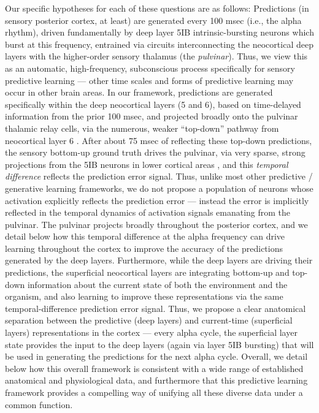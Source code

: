 \documentclass[11pt,twoside]{article}
\newif\myifpdf
\begin{document}
Our specific hypotheses for each of these questions are as follows: Predictions (in sensory posterior cortex, at least) are generated every 100 msec (i.e., the alpha rhythm), driven fundamentally by deep layer 5IB intrinsic-bursting neurons which burst at this frequency, entrained via circuits interconnecting the neocortical deep layers with the higher-order sensory thalamus (the {\em pulvinar}).  Thus, we view this as an automatic, high-frequency, subconscious process specifically for sensory predictive learning --- other time scales and forms of predictive learning may occur in other brain areas.  In our framework, predictions are generated specifically within the deep neocortical layers (5 and 6), based on time-delayed information from the prior 100 msec, and projected broadly onto the pulvinar thalamic relay cells, via the numerous, weaker ``top-down'' pathway from neocortical layer 6 \cite{ShermanGuillery06}.  After about 75 msec of reflecting these top-down predictions, the sensory bottom-up ground truth drives the pulvinar, via very sparse, strong projections from the 5IB neurons in lower cortical areas \cite{ShermanGuillery06}, and this {\em temporal difference} reflects the prediction error signal.  Thus, unlike most other predictive / generative learning frameworks, we do not propose a population of neurons whose activation explicitly reflects the prediction error --- instead the error is implicitly reflected in the temporal dynamics of activation signals emanating from the pulvinar.  The pulvinar projects broadly throughout the posterior cortex, and we detail below how this temporal difference at the alpha frequency can drive learning throughout the cortex to improve the accuracy of the predictions generated by the deep layers.  Furthermore, while the deep layers are driving their predictions, the superficial neocortical layers are integrating bottom-up and top-down information about the current state of both the environment and the organism, and also learning to improve these representations via the same temporal-difference prediction error signal.  Thus, we propose a clear anatomical separation between the predictive (deep layers) and current-time (superficial layers) representations in the cortex --- every alpha cycle, the superficial layer state provides the input to the deep layers (again via layer 5IB bursting) that will be used in generating the predictions for the next alpha cycle.  Overall, we detail below how this overall framework is consistent with a wide range of established anatomical and physiological data, and furthermore that this predictive learning framework provides a compelling way of unifying all these diverse data under a common function.
\end{document}
